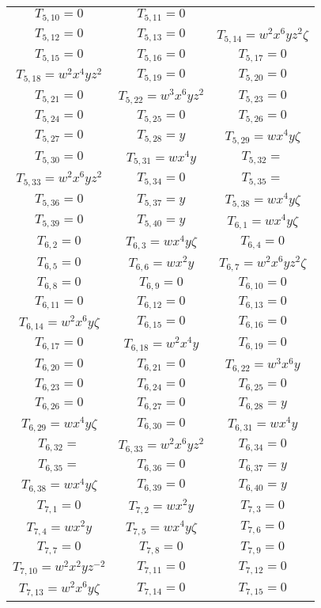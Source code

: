 \documentclass[12pt]{memoireuqam1.3}
\begin{document}
\begin{longtable}{|c|c|c|}
$T_{5,10}= 0$&
$T_{5,11}= 0$\\
$T_{5,12}= 0$&
$T_{5,13}= 0$&
$T_{5,14}= w^2x^6yz^2\zeta$\\
$T_{5,15}= 0$&
$T_{5,16}= 0$&
$T_{5,17}= 0$\\
$T_{5,18}= w^2x^4yz^2$&
$T_{5,19}= 0$&
$T_{5,20}= 0$\\
$T_{5,21}= 0$&
$T_{5,22}= w^3x^6yz^2$&
$T_{5,23}= 0$\\
$T_{5,24}= 0$&
$T_{5,25}= 0$&
$T_{5,26}= 0$\\
$T_{5,27}= 0$&
$T_{5,28}= y$&
$T_{5,29}= wx^4y\zeta$\\
$T_{5,30}= 0$&
$T_{5,31}= wx^4y$&
$T_{5,32}= $\\
$T_{5,33}= w^2x^6yz^2$&
$T_{5,34}= 0$&
$T_{5,35}= $\\
$T_{5,36}= 0$&
$T_{5,37}= y$&
$T_{5,38}= wx^4y\zeta$\\
$T_{5,39}= 0$&
$T_{5,40}= y$&
$T_{6,1}= wx^4y\zeta$\\
$T_{6,2}= 0$&
$T_{6,3}= wx^4y\zeta$&
$T_{6,4}= 0$\\
$T_{6,5}= 0$&
$T_{6,6}= wx^2y$&
$T_{6,7}= w^2x^6yz^2\zeta$\\
$T_{6,8}= 0$&
$T_{6,9}= 0$&
$T_{6,10}= 0$\\
$T_{6,11}= 0$&
$T_{6,12}= 0$&
$T_{6,13}= 0$\\
$T_{6,14}= w^2x^6y\zeta$&
$T_{6,15}= 0$&
$T_{6,16}= 0$\\
$T_{6,17}= 0$&
$T_{6,18}= w^2x^4y$&
$T_{6,19}= 0$\\
$T_{6,20}= 0$&
$T_{6,21}= 0$&
$T_{6,22}= w^3x^6y$\\
$T_{6,23}= 0$&
$T_{6,24}= 0$&
$T_{6,25}= 0$\\
$T_{6,26}= 0$&
$T_{6,27}= 0$&
$T_{6,28}= y$\\
$T_{6,29}= wx^4y\zeta$&
$T_{6,30}= 0$&
$T_{6,31}= wx^4y$\\
$T_{6,32}= $&
$T_{6,33}= w^2x^6yz^2$&
$T_{6,34}= 0$\\
$T_{6,35}= $&
$T_{6,36}= 0$&
$T_{6,37}= y$\\
$T_{6,38}= wx^4y\zeta$&
$T_{6,39}= 0$&
$T_{6,40}= y$\\
$T_{7,1}= 0$&
$T_{7,2}= wx^2y$&
$T_{7,3}= 0$\\
$T_{7,4}= wx^2y$&
$T_{7,5}= wx^4y\zeta$&
$T_{7,6}= 0$\\
$T_{7,7}= 0$&
$T_{7,8}= 0$&
$T_{7,9}= 0$\\
$T_{7,10}= w^2x^2yz^{-2}$&
$T_{7,11}= 0$&
$T_{7,12}= 0$\\
$T_{7,13}= w^2x^6y\zeta$&
$T_{7,14}= 0$&
$T_{7,15}= 0$\\

\end{longtable}
\end{document}
